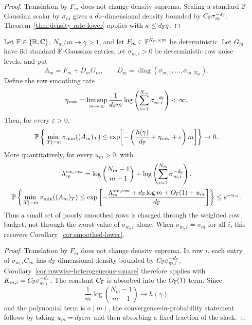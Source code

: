 \begin{proof}
Translation by \(F_m\) does not change density suprema.  Scaling a standard
\(\mathbb{F}\)-Gaussian scalar by \(\sigma_m\) gives a \(d_{\mathbb{F}}\)-dimensional density
bounded by \(C_{\mathbb{F}}\sigma_m^{-d_{\mathbb{F}}}\).  Theorem~\ref{thm:density-rate-lower}
applies with \(\kappa\le d_{\mathbb{F}}\eta\).
\end{proof}

\begin{corollary}\label{cor:rowwise-smoothed-lower}
Let \(\mathbb{F}\in\{\mathbb{R},\mathbb{C}\}\), \(N_m/m\to\gamma>1\), and let
\(F_m\in\mathbb{F}^{N_m\times m}\) be deterministic.  Let \(G_m\) have iid standard
\(\mathbb{F}\)-Gaussian entries, let \(\sigma_{m,i}>0\) be deterministic row noise
levels, and put
\[
  A_m=F_m+D_mG_m,\qquad
  D_m=\operatorname{diag}(\sigma_{m,1},\ldots,\sigma_{m,N_m}).
\]
Define the row smoothing rate
\[
  \eta_{\rm row}
  =
  \limsup_{m\to\infty}
  \frac{1}{d_{\mathbb{F}} m}\log\left(\sum_{i=1}^{N_m}\sigma_{m,i}^{-d_{\mathbb{F}}}\right)
  <\infty .
\]
Then, for every \(\varepsilon>0\),
\[
  \mathbb{P}\left\{
  \min_{|T|=m}\sigma_{\min}((A_m)_T)
  \le
  \exp\!\left[-\left(\frac{h(\gamma)}{d_{\mathbb{F}}}
       +\eta_{\rm row}+\varepsilon\right)m\right]\right\}\to0 .
\]
More quantitatively, for every \(u_m>0\),
with
\[
  \Lambda_m^{\rm sm,row}
  =
  \log\binom{N_m-1}{m-1}
  +\log\left(\sum_{i=1}^{N_m}\sigma_{m,i}^{-d_{\mathbb{F}}}\right),
\]
\[
  \mathbb{P}\left\{
  \min_{|T|=m}\sigma_{\min}((A_m)_T)
  \le
  \exp\left[-\frac{\Lambda_m^{\rm sm,row}
    +d_{\mathbb{F}}\log m+O_{\mathbb{F}}(1)+u_m}{d_{\mathbb{F}}}\right]\right\}
  \le e^{-u_m}.
\]
Thus a small set of poorly smoothed rows is charged through the weighted row
budget, not through the worst value of \(\sigma_{m,i}\) alone.  When
\(\sigma_{m,i}=\sigma_m\) for all \(i\), this recovers
Corollary~\ref{cor:smoothed-lower}.
\end{corollary}

\begin{proof}
Translation by \(F_m\) does not change density suprema.  In row \(i\), each
entry of \(\sigma_{m,i}G_m\) has \(d_{\mathbb{F}}\)-dimensional density bounded by
\(C_{\mathbb{F}}\sigma_{m,i}^{-d_{\mathbb{F}}}\).  Corollary~\ref{cor:rowwise-heterogeneous-square}
therefore applies with \(K_{m,i}=C_{\mathbb{F}}\sigma_{m,i}^{-d_{\mathbb{F}}}\).  The constant
\(C_{\mathbb{F}}\) is absorbed into the \(O_{\mathbb{F}}(1)\) term.  Since
\[
  \frac1m\log\binom{N_m-1}{m-1}\to h(\gamma)
\]
and the polynomial term is \(o(m)\), the convergence-in-probability statement
follows by taking \(u_m=d_{\mathbb{F}}\varepsilon m\) and then absorbing a fixed fraction
of the slack.
\end{proof}

